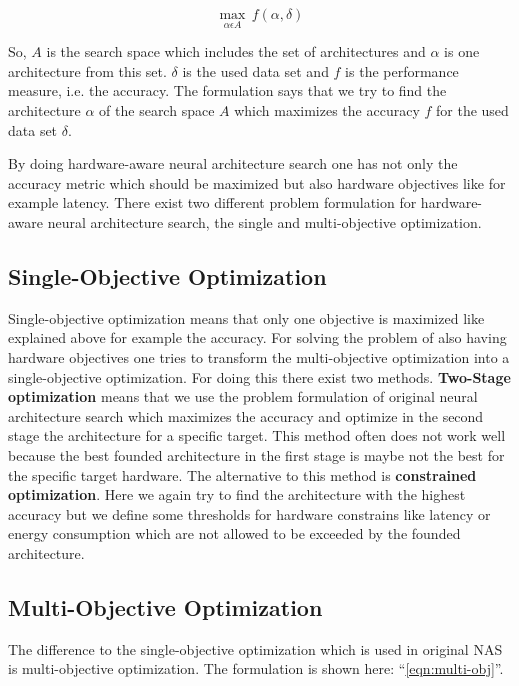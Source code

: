 \documentclass[conference]{IEEEtran}
\begin{document}
\begin{equation}
\label{eqn:single-obj}
\max_{\alpha\epsilon A}\,f(\alpha, \delta)
\end{equation}

So, $A$ is the search space which includes the set of architectures and $\alpha$ is one architecture from this set. $\delta$ is the used data set and $f$ is the performance measure, i.e. the accuracy. The formulation says that we try to find the architecture $\alpha$ of the search space $A$ which maximizes the accuracy $f$ for the used data set $\delta$. 
 
By doing hardware-aware neural architecture search one has not only the accuracy metric which should be maximized but also hardware objectives like for example latency. There exist two different problem formulation for hardware-aware neural architecture search, the single and multi-objective optimization.

\subsection{Single-Objective Optimization}

Single-objective optimization means that only one objective is maximized like explained above for example the accuracy. For solving the problem of also having hardware objectives one tries to transform the multi-objective optimization into a single-objective optimization. For doing this there exist two methods. \textbf{Two-Stage optimization} means that we use the problem formulation of original neural architecture search which maximizes the accuracy and optimize in the second stage the architecture for a specific target. This method often does not work well because the best founded architecture in the first stage is maybe not the best for the specific target hardware. The alternative to this method is \textbf{constrained optimization}. Here we again try to find the architecture with the highest accuracy but we define some thresholds for hardware constrains like latency or energy consumption which are not allowed to be exceeded by the founded architecture. 

\subsection{Multi-Objective Optimization}

The difference to the single-objective optimization which is used in original NAS is multi-objective optimization. The formulation is shown here: ``\eqref{eqn:multi-obj}''.
 
\end{document}
